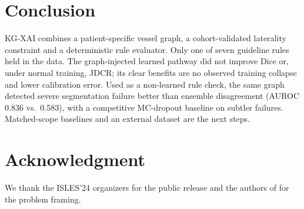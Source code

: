 \documentclass[conference]{IEEEtran}
\begin{document}
\section{Conclusion}
KG-XAI combines a patient-specific vessel graph, a cohort-validated laterality constraint and a deterministic rule evaluator. Only one of seven guideline rules held in the data. The graph-injected learned pathway did not improve Dice or, under normal training, JDCR; its clear benefits are no observed training collapse and lower calibration error. Used as a non-learned rule check, the same graph detected severe segmentation failure better than ensemble disagreement (AUROC 0.836 vs.\ 0.583), with a competitive MC-dropout baseline on subtler failures. Matched-scope baselines and an external dataset are the next steps.

\section*{Acknowledgment}
We thank the ISLES'24 organizers for the public release and the authors of \cite{luan2026} for the problem framing.
\end{document}
